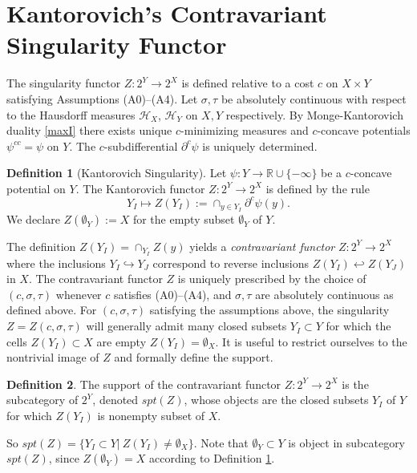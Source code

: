 \documentclass[12pt]{amsart}
\theoremstyle{definition}
\newtheorem{dfn}{Definition}
\theoremstyle{remark}
\newcommand{\bR}{\mathbb{R}}
\newcommand{\del}{\partial}
\newcommand{\ysub}{\del^c \psi(y)}
\begin{document}
\section{Kantorovich's Contravariant Singularity Functor}\label{ks-1}

The singularity functor $Z: 2^Y \to 2^X$ is defined relative to a cost $c$ on $X \times Y$ satisfying Assumptions (A0)--(A4). Let $\sigma, \tau$ be absolutely continuous with respect to the Hausdorff measures $\mathscr{H}_X$, $\mathscr{H}_Y$ on $X, Y$ respectively. By Monge-Kantorovich duality \ref{maxI} there exists unique $c$-minimizing measures and $c$-concave potentials $\psi^{cc}=\psi$ on $Y$. The $c$-subdifferential $\del^c \psi$ is uniquely determined.

\begin{dfn}[Kantorovich Singularity]
\label{ks} 
Let $\psi: Y\to \bR \cup \{-\infty\}$ be a $c$-concave potential on $Y$. The Kantorovich functor $Z: 2^Y \to 2^X$ is defined by the rule 
$$Y_I\mapsto Z(Y_I):=\cap_{y\in Y_I} \ysub.$$ We declare $Z(\emptyset_Y):=X$ for the empty subset $\emptyset_Y$ of $Y$.
\end{dfn}

The definition $Z(Y_I)=\cap_{Y_I} Z(y)$ yields a \textit{contravariant functor} $Z:2^Y \to 2^X$ where the inclusions $Y_I \hookrightarrow Y_J$ correspond to reverse inclusions $Z(Y_I) \hookleftarrow Z(Y_J)$ in $X$. The contravariant functor $Z$ is uniquely prescribed by the choice of $(c, \sigma, \tau)$ whenever $c$ satisfies (A0)--(A4), and $\sigma, \tau$ are absolutely continuous as defined above. For $(c, \sigma, \tau)$ satisfying the assumptions above, the singularity $Z=Z(c, \sigma, \tau)$ will generally admit many closed subsets $Y_I \subset Y$ for which the cells $Z(Y_I)\subset X$ are empty $Z(Y_I)=\emptyset_X$. It is useful to restrict ourselves to the nontrivial image of $Z$ and formally define the support. 

\begin{dfn}
The support of the contravariant functor $Z: 2^Y \to 2^X$ is the subcategory of $2^Y$, denoted $spt(Z)$, whose objects are the closed subsets $Y_I$ of $Y$ for which $Z(Y_I)$ is nonempty subset of $X$. 
\end{dfn}
So $spt(Z)=\{Y_I \subset Y|~ Z(Y_I) \neq \emptyset_X\}.$ 
Note that $\emptyset_Y \subset Y$ is object in subcategory $spt(Z)$, since $Z(\emptyset_Y)=X$ according to Definition \ref{ks}. 
\end{document}
